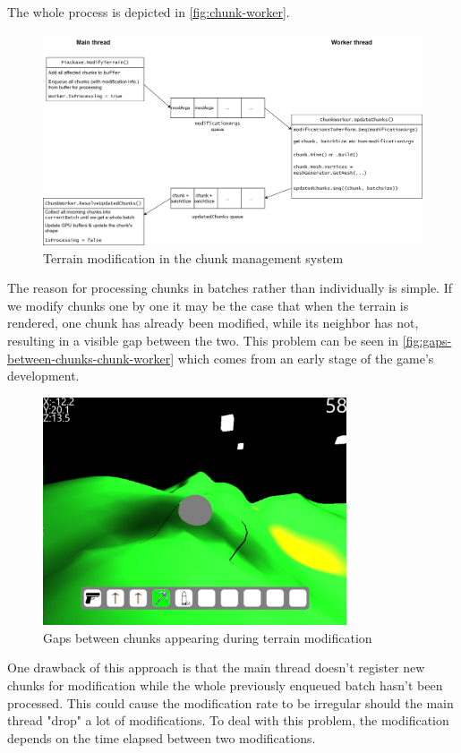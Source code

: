 The whole process is depicted in \autoref{fig:chunk-worker}.
\begin{figure}[h] %
    \centering
    \includegraphics[width=1\textwidth]{chapters/implementation/sections/chunk_management_system/resources/chunkWorker.drawio.png}
    \caption{Terrain modification in the chunk management system}
    \label{fig:chunk-worker}
\end{figure}

The reason for processing chunks in batches rather than individually is simple.
If we modify chunks one by one it may be the case that when the terrain is rendered, one chunk has already been modified, while its neighbor has not, resulting in a visible gap between the two.
This problem can be seen in \autoref{fig:gaps-between-chunks-chunk-worker} which comes from an early stage of the game's development.
\begin{figure}[h]
    \centering
    \includegraphics[width=0.8\textwidth]{chapters/implementation/sections/chunk_management_system/resources/gaps-between-chunks.png}
    \caption{Gaps between chunks appearing during terrain modification}
    \label{fig:gaps-between-chunks-chunk-worker}
\end{figure}

One drawback of this approach is that the main thread doesn't register new chunks for modification while the whole previously enqueued batch hasn't been processed.
This could cause the modification rate to be irregular should the main thread "drop" a lot of modifications.
To deal with this problem, the modification depends on the time elapsed between two modifications.